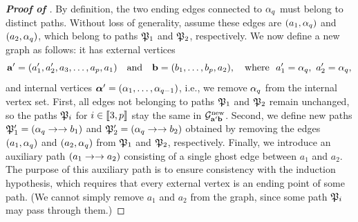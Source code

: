 \begin{proof}[\bf Proof of ]
By definition, the two ending edges connected to $\alpha_q$ must belong to distinct paths. 
Without loss of generality, assume these edges are $(a_1,\alpha_q)$ and $(a_2,\alpha_q)$, which belong to paths $\mathfrak{P}_1$ and $\mathfrak{P}_2$, respectively. We now define a new graph  as follows: it has external vertices 
\[\ba'=(a_1',a_2',a_3,\ldots,a_p,a_1)\quad \text{and}\quad \bfb=(b_1,\ldots,b_p,a_2), \quad \text{where}\ \ a_1'=\al_q, \ a_2'=\al_q,\] 
and internal vertices ${\boldsymbol{\alpha}}'=(\alpha_1,\ldots,\alpha_{q-1})$, i.e., we remove $\alpha_q$ from the internal vertex set. 
First, all edges not belonging to paths $\mathfrak{P}_1$ and $\mathfrak{P}_2$ remain unchanged, so the paths $\mathfrak{P}_i$ for $i\in\llbracket{3,p}\rrbracket$ stay the same in $\mathcal G^{\mathrm{new}}_{{\mathbf{a}}'{\mathbf{b}}}$. Second, we define new paths $\mathfrak{P}'_1=(\alpha_q\to \to b_1)$ and $\mathfrak{P}_2'=(\alpha_q\to \to b_2)$ obtained by removing the edges $(a_1,\alpha_q)$ and $(a_2,\alpha_q)$ from $\mathfrak{P}_1$ and $\mathfrak{P}_2$, respectively. 
Finally, we introduce an auxiliary path $(a_1\to \to a_2)$ consisting of a single ghost edge between $a_1$ and $a_2$. The purpose of this auxiliary path is to ensure consistency with the induction hypothesis, which requires that every external vertex is an ending point of some path. (We cannot simply remove $a_1$ and $a_2$ from the graph, since some path $\mathfrak{P}_i$ may pass through them.)


\end{proof}
